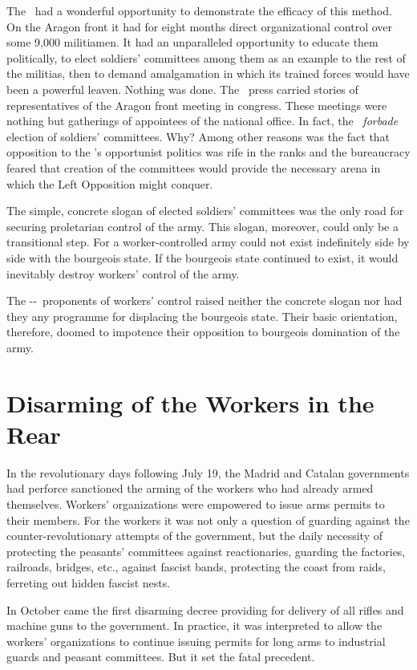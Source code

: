 The \POUM\ had a wonderful opportunity to demonstrate the efficacy of this method. On the Aragon front it had for eight months direct organizational control over some 9,000 militiamen. It had an unparalleled opportunity to educate them politically, to elect soldiers’ committees among them as an example to the rest of the militias, then to demand amalgamation in which its trained forces would have been a powerful leaven. Nothing was done. The \POUM\ press carried stories of representatives of the Aragon front meeting in congress. These meetings were nothing but gatherings of appointees of the national office. In fact, the \POUM\ \emph{forbade} election of soldiers’ committees. Why? Among other reasons was the fact that opposition to the \POUM’s opportunist politics was rife in the ranks and the bureaucracy feared that creation of the committees would provide the necessary arena in which the Left Opposition might conquer.

The simple, concrete slogan of elected soldiers’ committees was the only road for securing proletarian control of the army. This slogan, moreover, could only be a transitional step. For a worker-controlled army could not exist indefinitely side by side with the bourgeois state. If the bourgeois state continued to exist, it would inevitably destroy workers’ control of the army.

The \POUM-\CNT-\UGT\ proponents of workers’ control raised neither the concrete slogan nor had they any programme for displacing the bourgeois state. Their basic orientation, therefore, doomed to impotence their opposition to bourgeois domination of the army.

\section{Disarming of the Workers in the Rear}

In the revolutionary days following July 19, the Madrid and Catalan governments had perforce sanctioned the arming of the workers who had already armed themselves. Workers’ organizations were empowered to issue arms permits to their members. For the workers it was not only a question of guarding against the counter-revolutionary attempts of the government, but the daily necessity of protecting the peasants’ committees against reactionaries, guarding the factories, railroads, bridges, etc., against fascist bands, protecting the coast from raids, ferreting out hidden fascist nests.

In October came the first disarming decree providing for delivery of all rifles and machine guns to the government. In practice, it was interpreted to allow the workers’ organizations to continue issuing permits for long arms to industrial guards and peasant committees. But it set the fatal precedent.

